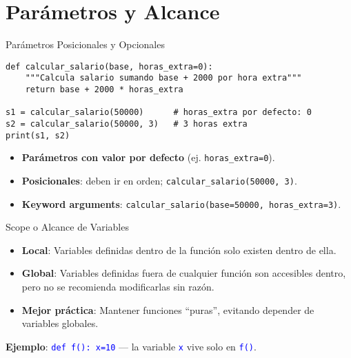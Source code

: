 \documentclass[10pt]{beamer}
\begin{document}
\section{Parámetros y Alcance}

\begin{frame}[fragile]{Parámetros Posicionales y Opcionales}
\begin{verbatim}
def calcular_salario(base, horas_extra=0):
    """Calcula salario sumando base + 2000 por hora extra"""
    return base + 2000 * horas_extra

s1 = calcular_salario(50000)      # horas_extra por defecto: 0
s2 = calcular_salario(50000, 3)   # 3 horas extra
print(s1, s2)
\end{verbatim}
\begin{itemize}
  \item \textbf{Parámetros con valor por defecto} (ej. \texttt{horas\_extra=0}).
  \item \textbf{Posicionales}: deben ir en orden; \texttt{calcular\_salario(50000, 3)}.
  \item \textbf{Keyword arguments}: \texttt{calcular\_salario(base=50000, horas\_extra=3)}.
\end{itemize}
\end{frame}

\begin{frame}{Scope o Alcance de Variables}
  \begin{itemize}
    \item \textbf{Local}: Variables definidas dentro de la función solo existen dentro de ella.
    \item \textbf{Global}: Variables definidas fuera de cualquier función son accesibles dentro, pero no se recomienda modificarlas sin razón.
    \item \textbf{Mejor práctica}: Mantener funciones “puras”, evitando depender de variables globales.
  \end{itemize}
  \vspace{0.2cm}
  \textbf{Ejemplo}: {\texttt{\textcolor{blue}{def f(): x=10}}} — la variable {\texttt{\textcolor{blue}{x}}} vive solo en {\texttt{\textcolor{blue}{f()}}}.
\end{frame}
\end{document}

